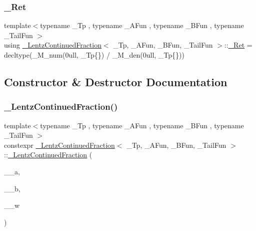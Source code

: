 \mbox{\label{class__LentzContinuedFraction_ae549d8853f57a08201bea3a926d30992}} 
\subsubsection{\texorpdfstring{\+\_\+\+Ret}{\_Ret}}
{\footnotesize\ttfamily template$<$typename \+\_\+\+Tp , typename \+\_\+\+A\+Fun , typename \+\_\+\+B\+Fun , typename \+\_\+\+Tail\+Fun $>$ \\
using \hyperlink{class__LentzContinuedFraction}{\+\_\+\+Lentz\+Continued\+Fraction}$<$ \+\_\+\+Tp, \+\_\+\+A\+Fun, \+\_\+\+B\+Fun, \+\_\+\+Tail\+Fun $>$\+::\hyperlink{class__LentzContinuedFraction_ae549d8853f57a08201bea3a926d30992}{\+\_\+\+Ret} =  decltype(\+\_\+\+M\+\_\+num(0ull, \+\_\+\+Tp\{\}) / \+\_\+\+M\+\_\+den(0ull, \+\_\+\+Tp\{\}))}



\subsection{Constructor \& Destructor Documentation}
\mbox{\label{class__LentzContinuedFraction_a329c859fde4ae8a79b4fdc04731a1901}} 
\subsubsection{\texorpdfstring{\+\_\+\+Lentz\+Continued\+Fraction()}{\_LentzContinuedFraction()}}
{\footnotesize\ttfamily template$<$typename \+\_\+\+Tp , typename \+\_\+\+A\+Fun , typename \+\_\+\+B\+Fun , typename \+\_\+\+Tail\+Fun $>$ \\
constexpr \hyperlink{class__LentzContinuedFraction}{\+\_\+\+Lentz\+Continued\+Fraction}$<$ \+\_\+\+Tp, \+\_\+\+A\+Fun, \+\_\+\+B\+Fun, \+\_\+\+Tail\+Fun $>$\+::\hyperlink{class__LentzContinuedFraction}{\+\_\+\+Lentz\+Continued\+Fraction} (\begin{DoxyParamCaption}\item[{\+\_\+\+A\+Fun}]{\+\_\+\+\_\+a,  }\item[{\+\_\+\+B\+Fun}]{\+\_\+\+\_\+b,  }\item[{\+\_\+\+Tail\+Fun}]{\+\_\+\+\_\+w }\end{DoxyParamCaption})\hspace{0.3cm}{\ttfamily [inline]}}



